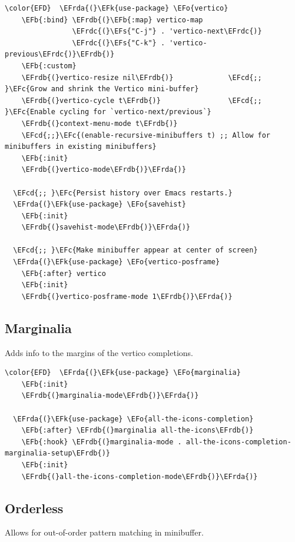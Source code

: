 \documentclass[11pt]{article}
\newcommand{\EFc}[1]{\textcolor{EFc}{#1}} %
\newcommand{\EFcd}[1]{\textcolor{EFcd}{#1}} %
\newcommand{\EFs}[1]{\textcolor{EFs}{#1}} %
\newcommand{\EFk}[1]{\textcolor{EFk}{#1}} %
\newcommand{\EFb}[1]{\textcolor{EFb}{#1}} %
\newcommand{\EFo}[1]{\textcolor{EFo}{#1}} %
\newcommand{\EFrda}[1]{\textcolor{EFrda}{#1}} %
\newcommand{\EFrdb}[1]{\textcolor{EFrdb}{#1}} %
\newcommand{\EFrdc}[1]{\textcolor{EFrdc}{#1}} %
\begin{document}
\begin{Code}
\begin{Verbatim}
\color{EFD}  \EFrda{(}\EFk{use-package} \EFo{vertico}
    \EFb{:bind} \EFrdb{(}\EFb{:map} vertico-map
                \EFrdc{(}\EFs{"C-j"} . 'vertico-next\EFrdc{)}
                \EFrdc{(}\EFs{"C-k"} . 'vertico-previous\EFrdc{)}\EFrdb{)}
    \EFb{:custom}
    \EFrdb{(}vertico-resize nil\EFrdb{)}             \EFcd{;; }\EFc{Grow and shrink the Vertico mini-buffer}
    \EFrdb{(}vertico-cycle t\EFrdb{)}                \EFcd{;; }\EFc{Enable cycling for `vertico-next/previous`}
    \EFrdb{(}context-menu-mode t\EFrdb{)}
    \EFcd{;;}\EFc{(enable-recursive-minibuffers t) ;; Allow for minibuffers in existing minibuffers}
    \EFb{:init}
    \EFrdb{(}vertico-mode\EFrdb{)}\EFrda{)}

  \EFcd{;; }\EFc{Persist history over Emacs restarts.}
  \EFrda{(}\EFk{use-package} \EFo{savehist}
    \EFb{:init}
    \EFrdb{(}savehist-mode\EFrdb{)}\EFrda{)}

  \EFcd{;; }\EFc{Make minibuffer appear at center of screen}
  \EFrda{(}\EFk{use-package} \EFo{vertico-posframe}
    \EFb{:after} vertico
    \EFb{:init}
    \EFrdb{(}vertico-posframe-mode 1\EFrdb{)}\EFrda{)}
\end{Verbatim}
\end{Code}

\subsection{Marginalia}
\label{sec:org84a097f}
Adds info to the margins of the vertico completions.

\begin{Code}
\begin{Verbatim}
\color{EFD}  \EFrda{(}\EFk{use-package} \EFo{marginalia}
    \EFb{:init}
    \EFrdb{(}marginalia-mode\EFrdb{)}\EFrda{)}

  \EFrda{(}\EFk{use-package} \EFo{all-the-icons-completion}
    \EFb{:after} \EFrdb{(}marginalia all-the-icons\EFrdb{)}
    \EFb{:hook} \EFrdb{(}marginalia-mode . all-the-icons-completion-marginalia-setup\EFrdb{)}
    \EFb{:init}
    \EFrdb{(}all-the-icons-completion-mode\EFrdb{)}\EFrda{)}
\end{Verbatim}
\end{Code}

\subsection{Orderless}
\label{sec:orgafdc8e5}
Allows for out-of-order pattern matching in minibuffer.
\end{document}
